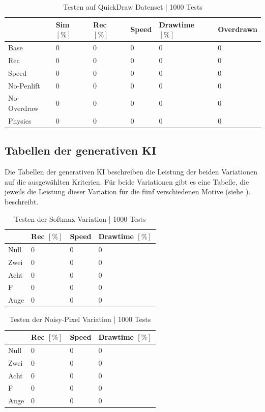 \begin{table}[!ht]
    \centering
    \caption{Testen auf QuickDraw Datenset | 1000 Tests}\label{tab:Quickdraw}
    \begin{tabular}{|l|l|l|l|l|l|}
        \hline ~ & Sim $[\%]$ & Rec $[\%]$ & Speed & Drawtime $[\%]$ & Overdrawn \\ \hline
        Base & 0 & 0 & 0 & 0 & 0 \\ \hline
        Rec & 0 & 0 & 0 & 0 & 0 \\ \hline
        Speed & 0 & 0 & 0 & 0 & 0 \\ \hline
        No-Penlift & 0 & 0 & 0 & 0 & 0 \\ \hline
        No-Overdraw & 0 & 0 & 0 & 0 & 0 \\ \hline
        Physics & 0 & 0 & 0 & 0 & 0 \\ \hline
    \end{tabular}
\end{table}


\subsection{Tabellen der generativen KI}\label{sub:r_tab_gen} Die Tabellen der
generativen KI beschreiben die Leistung der beiden Variationen auf die
ausgewählten Kriterien. Für beide Variationen gibt es eine Tabelle, die jeweils
die Leistung dieser Variation für die fünf verschiedenen Motive (siehe
). beschreibt. 


\begin{table}[!ht]
    \centering
    \caption{Testen der Softmax Variation | 1000 Tests}\label{tab:gen-softmax}
    \begin{tabular}{|l|l|l|l|}
    \hline
        ~ & Rec $[\%]$ & Speed & Drawtime $[\%]$ \\ \hline
        Null & 0 & 0 & 0 \\ \hline
        Zwei & 0 & 0 & 0 \\ \hline
        Acht & 0 & 0 & 0 \\ \hline
        F & 0 & 0 & 0 \\ \hline
        Auge & 0 & 0 & 0 \\ \hline
    \end{tabular}
\end{table}

\begin{table}[!ht]
    \centering
    \caption{Testen der Noisy-Pixel Variation | 1000 Tests}\label{tab:gen-noisy}
    \begin{tabular}{|l|l|l|l|}
    \hline
        ~ & Rec $[\%]$ & Speed & Drawtime $[\%]$ \\ \hline
        Null & 0 & 0 & 0 \\ \hline
        Zwei & 0 & 0 & 0 \\ \hline
        Acht & 0 & 0 & 0 \\ \hline
        F & 0 & 0 & 0 \\ \hline
        Auge & 0 & 0 & 0 \\ \hline
    \end{tabular}
\end{table}




